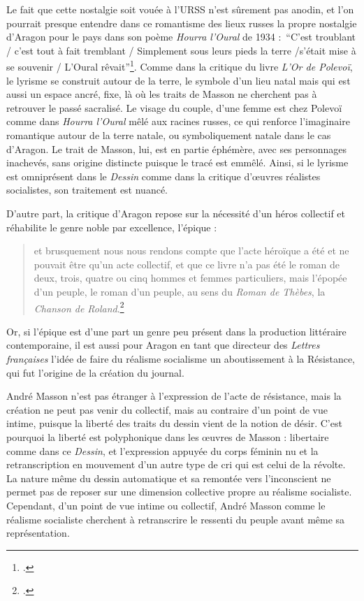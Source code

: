 Le fait que cette nostalgie soit vouée à l’URSS n’est sûrement pas anodin, et l’on pourrait presque entendre dans ce romantisme des lieux russes la propre nostalgie d’Aragon pour le pays dans son poème \emph{Hourra l’Oural} de 1934 : \enquote{C’est troublant / c’est tout à fait tremblant / Simplement sous leurs pieds la terre /s’était mise à se souvenir / L’Oural rêvait}\footcite{hourra}. Comme dans la critique du livre \emph{L’Or de Polevoï}, le lyrisme se construit autour de la terre, le symbole d’un lieu natal mais qui est aussi un espace ancré, fixe, là où les traits de Masson ne cherchent pas à retrouver le passé sacralisé. Le visage du couple, d’une femme est chez Polevoï comme dans \emph{Hourra l’Oural} mêlé aux racines russes, ce qui renforce l’imaginaire romantique autour de la terre natale, ou symboliquement natale dans le cas d’Aragon. Le trait de Masson, lui, est en partie éphémère, avec ses personnages inachevés, sans origine distincte puisque le tracé est emmêlé. Ainsi, si le lyrisme est omniprésent dans le \emph{Dessin} comme dans la critique d’\oe{}uvres réalistes socialistes, son traitement est nuancé.


	D’autre part, la critique d’Aragon repose sur la nécessité d’un héros collectif et réhabilite le genre noble par excellence, l’épique : 
	\begin{quote}
	et brusquement nous nous rendons compte que l’acte héroïque a été et ne pouvait être qu’un acte collectif, et que ce livre n’a pas été le roman de deux, trois, quatre ou cinq hommes et femmes particuliers, mais l’épopée d’un peuple, le roman d’un peuple, au sens du \emph{Roman de Thèbes}, la \emph{Chanson de Roland}.\footcite{realsoc}\end{quote}
	
	
	 Or, si l’épique est d’une part un genre peu présent dans la production littéraire contemporaine, il est aussi pour Aragon en tant que directeur des \emph{Lettres françaises} l'idée de faire du réalisme socialisme un aboutissement à la Résistance, qui fut l’origine de la création du journal. 

	André Masson n’est pas étranger à l’expression de l’acte de résistance, mais la création ne peut pas venir du collectif, mais au contraire d’un point de vue intime, puisque la liberté des traits du dessin vient de la notion de désir. C’est pourquoi la liberté est polyphonique dans les \oe{}uvres de Masson : libertaire comme dans ce \emph{Dessin}, et l’expression appuyée du corps féminin nu et la retranscription en mouvement d’un autre type de cri qui est celui de la révolte. La nature même du dessin automatique et sa remontée vers l’inconscient ne permet pas de reposer sur une dimension collective propre au réalisme socialiste. Cependant, d’un point de vue intime ou collectif, André Masson comme le réalisme socialiste cherchent à retranscrire le ressenti du peuple avant même sa représentation. 

